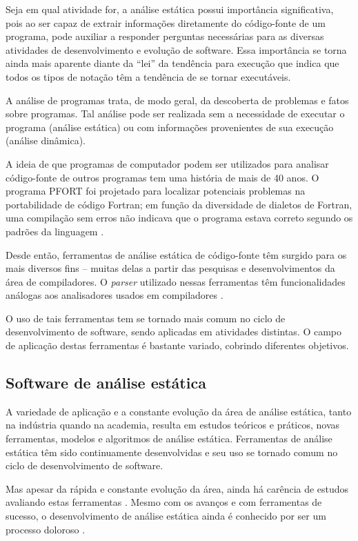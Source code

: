 Seja em qual atividade for, a análise estática possui importância significativa,
pois ao ser capaz de extrair informações diretamente do
código-fonte de um programa, pode auxiliar a responder perguntas necessárias
para as diversas atividades de desenvolvimento e evolução de software. Essa
importância se torna ainda mais aparente diante da ``lei'' da tendência para
execução \cite{harman2010why} que indica que todos os tipos de notação têm a
tendência de se tornar executáveis.

A análise de programas trata, de modo geral, da descoberta de problemas e
fatos sobre programas. Tal análise pode ser realizada sem a necessidade de executar o
programa (análise estática) ou com informações provenientes de sua execução
(análise dinâmica).

A ideia de que programas de computador podem ser utilizados para analisar
código-fonte de outros programas tem uma história de mais de 40 anos.  O
programa PFORT \cite{ryder1974pfort} foi projetado para localizar potenciais
problemas na portabilidade de código Fortran; em função da diversidade de
dialetos de Fortran, uma compilação sem erros não indicava que o programa
estava correto segundo os padrões da linguagem \cite{wichmann1995industrial}.

Desde então, ferramentas de análise estática de código-fonte têm surgido para
os mais diversos fins -- muitas delas a partir das pesquisas e
desenvolvimentos da área de compiladores.  O {\it parser} utilizado nessas
ferramentas têm funcionalidades análogas aos analisadores usados em
compiladores \cite{anderson2008the}.

O uso de tais ferramentas tem se tornado mais comum no ciclo de desenvolvimento de
software, sendo aplicadas em atividades distintas.
O campo de aplicação destas ferramentas é bastante variado, cobrindo diferentes
objetivos.

\subsection{Software de análise estática}

A variedade de aplicação e a constante evolução da área de análise estática, 
tanto na indústria quando na academia, resulta em  estudos teóricos e práticos, novas ferramentas, modelos e
algoritmos de análise estática. Ferramentas de análise estática têm sido
continuamente desenvolvidas e seu uso se tornado comum no ciclo de desenvolvimento de
software.

Mas apesar da rápida e constante evolução da área, ainda há carência de estudos
avaliando estas ferramentas \cite{li2010comparative}. Mesmo com os avanços e com
ferramentas de sucesso, o desenvolvimento de análise estática ainda é conhecido
por ser um processo doloroso \cite{toman2017taming}.

